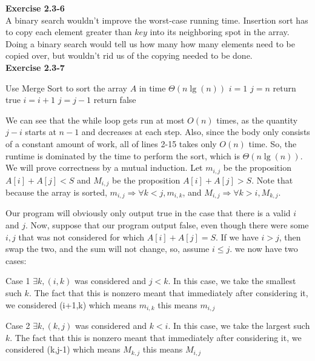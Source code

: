 \documentclass{article}
\begin{document}
\noindent\textbf{Exercise 2.3-6}\\

A binary search wouldn't improve the worst-case running time.  Insertion sort has to copy each element greater than $key$ into its neighboring spot in the array.  Doing a binary search would tell us how many how many elements need to be copied over, but wouldn't rid us of the copying needed to be done. \\

\noindent\textbf{Exercise 2.3-7}\\

\begin{algorithm} \begin{algorithmic}[1]
 \State Use Merge Sort to sort the array $A$ in time $\Theta(n\lg(n))$
\State $i=1$
\State $j = n$
 \State return true
 \EndIf
 \State $ i = i+1$
 \EndIf 
 \State $ j = j-1$
 \EndIf 
 \EndWhile
 \State return false
 \end{algorithmic}
\end{algorithm}

We can see that the while loop gets run at most $O(n)$ times, as the quantity $j-i$ starts at $n-1$ and decreases at each step. Also, since the body only consists of a constant amount of work, all of lines 2-15 takes only $O(n)$ time. So, the runtime is dominated by the time to perform the sort, which is $\Theta(n\lg(n))$. We will prove correctness by a mutual induction. Let $m_{i,j}$ be the proposition $A[i]+A[j]<S$ and $M_{i,j}$ be the proposition $A[i]+A[j]>S$. Note that because the array is sorted, $m_{i,j} \Rightarrow \forall k<j, m_{i,k}$, and $M_{i,j} \Rightarrow \forall k>i, M_{k,j}$. 

Our program will obviously only output true in the case that there is a valid $i$ and $j$. Now, suppose that our program output false, even though there were some $i,j$ that was not considered for which $A[i]+A[j]=S$. If we have $i>j$, then swap the two, and the sum will not change, so, assume $i\le j$. we now have two cases:

Case 1 $\exists k, (i,k)$ was considered and $j<k$. In this case, we take the smallest such $k$. The fact that this is nonzero meant that immediately after considering it, we considered (i+1,k) which means $m_{i,k}$ this means $m_{i,j}$

Case 2 $\exists k, (k,j)$ was considered and $k<i$. In this case, we take the largest such $k$. The fact that this is nonzero meant that immediately after considering it, we considered (k,j-1) which means $M_{k,j}$ this means $M_{i,j}$
\end{document}
